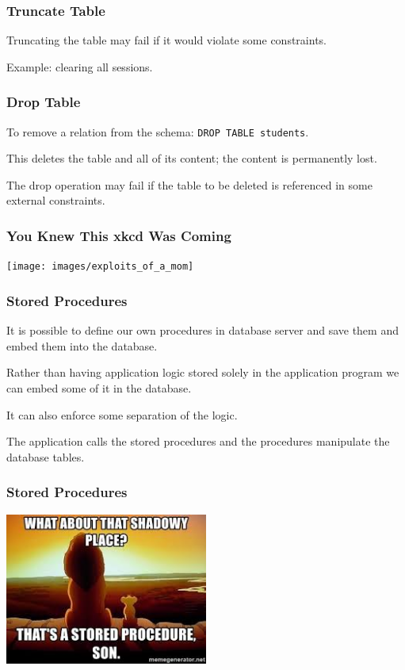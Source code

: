 \begin{frame}
\frametitle{Truncate Table}

Truncating the table may fail if it would violate some constraints.

Example: clearing all sessions.

\end{frame}

\begin{frame}
\frametitle{Drop Table}
To remove a relation from the schema: \texttt{DROP TABLE students}. 

This deletes the table and all of its content; the content is permanently lost. 

The drop operation may fail if the table to be deleted is referenced in some external constraints.
\end{frame}


\begin{frame}
\frametitle{You Knew This xkcd Was Coming}

\begin{center}
\texttt{[image: images/exploits\_of\_a\_mom]}
\end{center}

\end{frame}


\begin{frame}
\frametitle{Stored Procedures}

It is possible to define our own procedures in database server and save them and embed them into the database. 

Rather than having application logic stored solely in the application program we can embed some of it in the database. 

It can also enforce some separation of the logic.

The application calls the stored procedures and the procedures manipulate the database tables.


\end{frame}

\begin{frame}
\frametitle{Stored Procedures}


\begin{center}
	\includegraphics[width=0.5\textwidth]{images/storedprocedure.png}
\end{center}

\end{frame}


